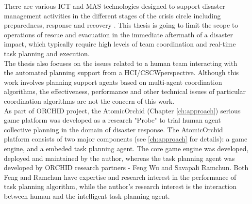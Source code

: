 There are various \ac{ICT} and \ac{MAS} technologies designed to support disaster management activities in the different stages of the crisis circle including preparedness, response and recovery \citep{Wattegama2012}. This thesis is going to limit the scope to operations of rescue and evacuation in the immediate aftermath of a disaster impact, which typically require high levels of team coordination and real-time task planning and execution.\\ 

The thesis also focuses on the issues related to a human team interacting with the automated planning support from a \ac{HCI}/\ac{CSCW}perspective. Although this work involves planning support agents based on multi-agent coordination algorithms, the effectiveness, performance and other technical issues of particular coordination algorithms are not the concern of this work.\\

As part of ORCHID project, the AtomicOrchid (Chapter \ref{ch:approach}) serious game platform was developed as a research "Probe" to trial human agent collective planning in the domain of disaster response. The AtomicOrchid platform consists of two major components (see \ref{ch:approach} for details): a game engine, and a embeded task planning agent. The core game engine was developed, deployed and maintained by the author, whereas the task planning agent was developed by ORCHID research partners - Feng Wu and Savapali Ramchun. Both Feng and Ramchun have expertise and research interest in the performance of task planning algorithm, while the author's research interest is the interaction between human and the intelligent task planning agent. \\

